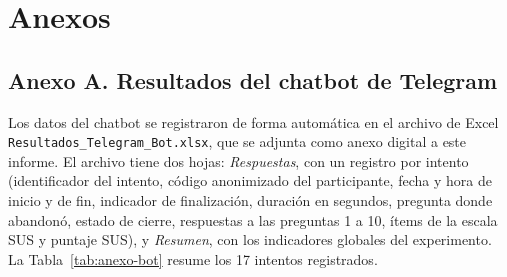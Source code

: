 \documentclass[12pt,letterpaper]{article}
\begin{document}
\printbibliography[title={Bibliografía}]

\section*{Anexos}

\subsection*{Anexo A. Resultados del chatbot de Telegram}

Los datos del chatbot se registraron de forma automática en el archivo de Excel \texttt{Resultados\_\allowbreak Telegram\_\allowbreak Bot.xlsx}, que se adjunta como anexo digital a este informe. El archivo tiene dos hojas: \textit{Respuestas}, con un registro por intento (identificador del intento, código anonimizado del participante, fecha y hora de inicio y de fin, indicador de finalización, duración en segundos, pregunta donde abandonó, estado de cierre, respuestas a las preguntas 1 a 10, ítems de la escala SUS y puntaje SUS), y \textit{Resumen}, con los indicadores globales del experimento. La Tabla~\ref{tab:anexo-bot} resume los 17 intentos registrados.
\end{document}
